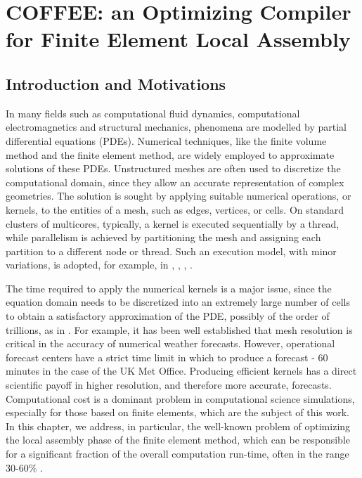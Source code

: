 \chapter{COFFEE: an Optimizing Compiler for Finite Element Local Assembly}
\section{Introduction and Motivations}
In many fields such as computational fluid dynamics, computational electromagnetics and structural mechanics, phenomena are modelled by partial differential equations (PDEs). Numerical techniques, like the finite volume method and the finite element method, are widely employed to approximate solutions of these PDEs. Unstructured meshes are often used to discretize the computational domain, since they allow an accurate representation of complex geometries. The solution is sought by applying suitable numerical operations, or
kernels, to the entities of a mesh, such as edges, vertices, or cells. On standard clusters of multicores, typically, a kernel is executed sequentially by a thread, while parallelism is achieved by partitioning the mesh and assigning each partition to a different node or thread. Such an execution model, with minor variations, is adopted, for example, in \cite{pyop2isc}, \cite{Fenics}, \cite{fluidity_manual_v4}, \cite{lizst}.

The time required to apply the numerical kernels is a major issue, since the equation domain needs to be discretized into an extremely large number of cells to obtain a satisfactory approximation of the PDE, possibly of the order of trillions, as in \cite{Rossinelli2013}. For example, it has been well established that mesh resolution is critical in the accuracy of numerical weather forecasts. However, operational forecast centers have a strict time limit in which to produce a forecast - 60 minutes in the case of the UK Met Office. Producing efficient kernels has a direct scientific payoff in higher resolution, and therefore more accurate, forecasts. Computational cost is a dominant problem in computational science simulations, especially for those based on finite elements, which are the subject of this work. In this chapter, we address, in particular, the well-known problem of optimizing the local assembly phase of the finite element method, which can be responsible for a significant fraction of the overall computation run-time, often in the range 30-60$\%$ \cite{Francis,quadrature1,petsc-integration-gpu,Kirby-FEM-opt}. 

